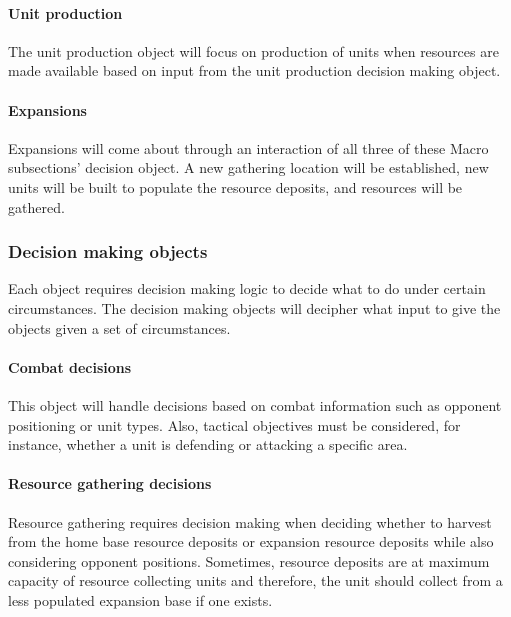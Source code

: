 \documentclass[10pt,letterpaper,onecolumn,draftclsnofoot]{IEEEtran}
\begin{document}
\paragraph{Unit production}
The unit production object will focus on production of units when resources are made available based on input from the unit production decision making object. 
\vspace{1mm}

\paragraph{Expansions}
Expansions will come about through an interaction of all three of these Macro subsections' decision object. A new gathering location will be established, new units will be built to populate the resource deposits, and resources will be gathered.
\vspace{1mm}

\subsubsection{Decision making objects}
Each object requires decision making logic to decide what to do under certain circumstances. The decision making objects will decipher what input to give the objects given a set of circumstances.
\vspace{1mm}

\paragraph{Combat decisions}
This object will handle decisions based on combat information such as opponent positioning or unit types. Also, tactical objectives must be considered, for instance, whether a unit is defending or attacking a specific area.
\vspace{1mm}

\paragraph{Resource gathering decisions}
Resource gathering requires decision making when deciding whether to harvest from the home base resource deposits or expansion resource deposits while also considering opponent positions. Sometimes, resource deposits are at maximum capacity of resource collecting units and therefore, the unit should collect from a less populated expansion base if one exists.
\vspace{1mm}
\end{document}
